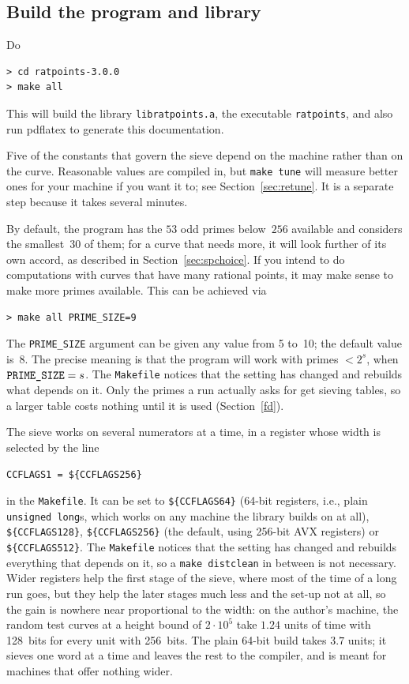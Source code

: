 \documentclass[12pt,a4paper,oneside]{amsart}
\begin{document}
\subsection{Build the program and library}

Do

\begin{verbatim}
> cd ratpoints-3.0.0
> make all
\end{verbatim}

This will build the library \texttt{libratpoints.a}, the executable
\texttt{ratpoints}, and also run pdf\/latex to generate this documentation.

Five of the constants that govern the sieve depend on the machine rather than
on the curve. Reasonable values are compiled in, but \texttt{make tune} will
measure better ones for your machine if you want it to; see
Section~\ref{sec:retune}. It is a separate step because it takes several
minutes.

By default, the program has the $53$ odd primes below~$256$ available and
considers the smallest~$30$ of them; for a curve that needs more, it will
look further of its own accord, as described in Section~\ref{sec:spchoice}.
If you intend to do computations with curves that have many rational points,
it may make sense to make more primes available. This can be achieved via

\begin{verbatim}
> make all PRIME_SIZE=9
\end{verbatim}

The \texttt{PRIME\_SIZE} argument can be given any value from 5 to~10;
the default value is~8. The precise meaning is that the program will
work with primes $< 2^s$, when $\text{\texttt{PRIME\_SIZE}} = s$. The
\texttt{Makefile} notices that the setting has changed and rebuilds what
depends on it. Only the primes a run actually asks for get sieving tables,
so a larger table costs nothing until it is used (Section~\ref{fd}).

The sieve works on several numerators at a time, in a register whose width is
selected by the line
\begin{verbatim}
CCFLAGS1 = ${CCFLAGS256}
\end{verbatim}
in the \texttt{Makefile}. It can be set to \verb+${CCFLAGS64}+ (64-bit
registers, i.e., plain \texttt{unsigned long}s, which works on any machine
the library builds on at all), \verb+${CCFLAGS128}+,
\verb+${CCFLAGS256}+ (the default, using 256-bit AVX registers) or
\verb+${CCFLAGS512}+. The \texttt{Makefile} notices that the setting has
changed and rebuilds everything that depends on it, so a \texttt{make
distclean} in between is not necessary. Wider
registers help the first stage of the sieve, where most of the time of a
long run goes, but they help the later stages much less and the set-up not
at all, so the gain is nowhere near proportional to the width: on the
author's machine, the random test curves at a height bound of $2\cdot10^5$
take $1.24$ units of time with 128~bits for every unit with 256~bits. The
plain 64-bit build takes $3.7$ units; it sieves one word at a time and leaves
the rest to the compiler, and is meant for machines that offer nothing
wider.
\end{document}
